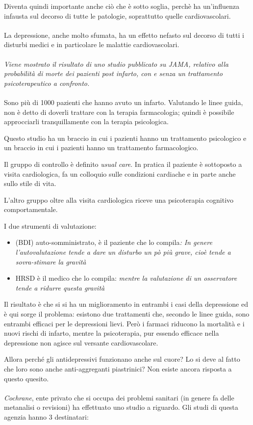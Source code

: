 \begin{itemize}
\begin{itemize}
Diventa quindi importante anche ciò che è sotto soglia, perchè ha
un'influenza infausta sul decorso di tutte le patologie, soprattutto
quelle cardiovascolari.
\\\\
La depressione, anche molto sfumata, ha un effetto nefasto sul decorso
di tutti i disturbi medici e in particolare le malattie cardiovascolari.
\\\\
\emph{Viene mostrato il risultato di uno studio pubblicato su JAMA,
relativo alla probabilità di morte dei pazienti post infarto, con e
senza un trattamento psicoterapeutico a confronto.}
\\\\
Sono più di 1000 pazienti che hanno avuto un infarto. Valutando le linee
guida, non è detto di doverli trattare con la terapia farmacologia;
quindi è possibile approcciarli tranquillamente con la terapia
psicologica.

Questo studio ha un braccio in cui i pazienti hanno un trattamento
psicologico e un braccio in cui i pazienti hanno un trattamento
farmacologico.

Il gruppo di controllo è definito \emph{usual care}. In pratica il
paziente è sottoposto a visita cardiologica, fa un colloquio sulle
condizioni cardiache e in parte anche sullo stile di vita.

L'altro gruppo oltre alla visita cardiologica riceve una psicoterapia
cognitivo comportamentale.

I due strumenti di valutazione:

\begin{itemize}
\item
  (BDI) auto-somministrato, è il paziente che lo compila\emph{: In
  genere l'autovalutazione tende a dare un disturbo un pò più grave,
  cioè tende a sovra-stimare la gravità}
\item
  HRSD è il medico che lo compila: \emph{mentre la valutazione di un
  osservatore tende a ridurre questa gravità}
\end{itemize}

Il risultato è che si si ha un miglioramento in entrambi i casi della
depressione ed è qui sorge il problema: esistono due trattamenti che,
secondo le linee guida, sono entrambi efficaci per le depressioni lievi.
Però i farmaci riducono la mortalità e i nuovi rischi di infarto, mentre
la psicoterapia, pur essendo efficace nella depressione non agisce sul
versante cardiovascolare.

Allora perché gli antidepressivi funzionano anche sul cuore? Lo si deve
al fatto che loro sono anche anti-aggreganti piastrinici? Non esiste
ancora risposta a questo quesito.
\\\\
\emph{Cochrane}, ente privato che si occupa dei problemi sanitari (in
genere fa delle metanalisi o revisioni) ha effettuato uno studio a
riguardo. Gli studi di questa agenzia hanno 3 destinatari:


\end{itemize}
\end{itemize}
